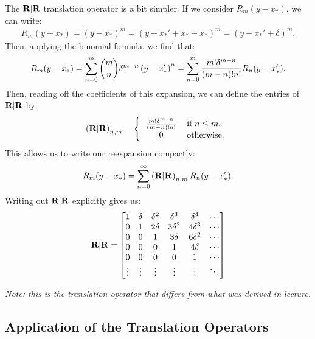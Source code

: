 The $\bold{R}|\bold{R}$
translation operator is a bit simpler. If we consider $R_m(y - x_*)$,
we can write:
\begin{align*}
  R_m(y - x_*) = (y - x_*)^m = (y - x_*' + x_* - x_*)^m = (y - x_*' + \delta)^m.
\end{align*}
Then, applying the binomial formula, we find that:
\begin{align*}
  R_m(y - x_*) = \sum_{n=0}^m {m \choose n} \delta^{m - n} \left(y - x_*'\right)^n = \sum_{n=0}^m {m! \delta^{m - n} \over (m - n)! n!} R_n(y - x_*').
\end{align*}
Then, reading off the coefficients of this expansion, we can define
the entries of $\bold{R}|\bold{R}$ by:
\begin{align*}
  \parens{\RRmat}_{n,m} = \left\{ \begin{tabular}{cl}
                                    ${m! \delta^{m - n} \over (m - n)! n!}$ & if $n \leq m$, \\
                                    $0$ & otherwise.
                                  \end{tabular} \right.
\end{align*}
This allows us to write our reexpansion compactly:
\begin{align*}
  R_m(y - x_*) = \sum_{n=0}^\infty \left(\bold{R}|\bold{R}\right)_{n,m} R_n(y - x_*').
\end{align*}
Writing out $\bold{R}|\bold{R}$ explicitly gives us:
\begin{align*}
  \bold{R}|\bold{R} = \begin{bmatrix}
    1 & \delta & \delta^2 & \delta^3 & \delta^4 & \cdots \\
    0 & 1 & 2\delta & 3 \delta^2 & 4\delta^3 & \cdots \\
    0 & 0 & 1 & 3 \delta & 6\delta^2 & \cdots \\
    0 & 0 & 0 & 1 & 4 \delta & \cdots \\
    0 & 0 & 0 & 0 & 1 & \cdots \\
    \vdots & \vdots & \vdots & \vdots & \vdots & \ddots
  \end{bmatrix}
\end{align*} 

\emph{Note: this is the translation operator that differs from what
  was derived in lecture.}

\subsection{Application of the Translation Operators}

